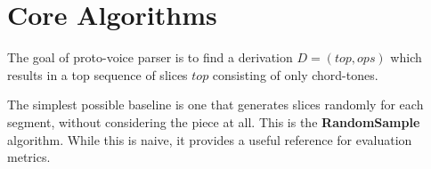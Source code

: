 \documentclass[12pt,a4paper,twoside,openany]{report} \usepackage[pdfborder={0 0 0}]{hyperref}    %
\theoremstyle{definition} \newtheorem{definition}{Definition}[section]
\begin{document}
%
%
%
%
%
%
%

\section{Core Algorithms} 
\label{sec:baselineAlgorithms}


The goal of proto-voice parser is to find a derivation $D= (top, ops)$ which results in
a top sequence of slices $top$ consisting of only chord-tones. 

The simplest possible baseline is one that generates slices randomly for each segment, without considering the piece at
all. This is the \textbf{RandomSample} algorithm. While this is naive, it provides a useful reference for evaluation
metrics.
\end{document}
